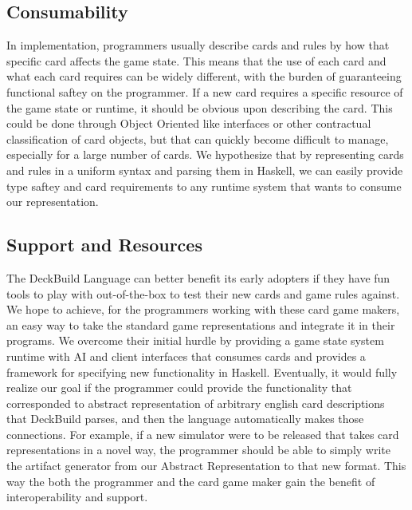 \subsection{Consumability}
In implementation, programmers usually describe cards and rules by how that specific card affects the game
state. This means that the use of each card and what each card requires can be widely different, with the burden
of guaranteeing functional saftey on the programmer. If a new card requires a specific resource of the game
state or runtime, it should be obvious upon describing the card. This could be done through Object Oriented like interfaces or other contractual classification
of card objects, but that can quickly become difficult to manage, especially for a large number of cards. We hypothesize that
by representing cards and rules in a uniform syntax and parsing them in Haskell, we can easily provide type saftey and
card requirements to any runtime system that wants to consume our representation.
\subsection{Support and Resources}
The DeckBuild Language can better benefit its early adopters if they have fun tools to play with out-of-the-box to test their new cards and game rules against.
We hope to achieve, for the programmers working
with these card game makers, an easy way to take the standard game representations and integrate it in their
programs. We overcome their initial hurdle by providing a game state system runtime with AI and client interfaces
that consumes cards and provides a framework for specifying new functionality in Haskell. Eventually, it would fully
realize our goal if the programmer could provide the functionality that corresponded to abstract representation of arbitrary
english card descriptions that DeckBuild parses, and then the language automatically makes those connections. For example, if a new
simulator were to be released that takes card representations in a novel way, the programmer should be able to simply write the artifact
generator from our Abstract Representation to that new format. This way the both the programmer and the card game maker gain the benefit
of interoperability and support.

